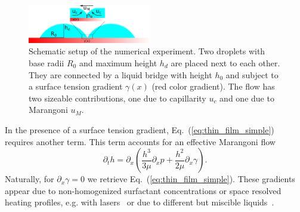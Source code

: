 \documentclass[twocolumn,amsmath,amssymb,showpacs,pre,nofootinbib,superscriptaddress]{revtex4-1} %
\begin{document}
\begin{figure}
    \centering
    \includegraphics[width=0.48\textwidth]{Figures/setup.png}
    \caption{Schematic setup of the numerical experiment. 
    Two droplets with base radii $R_0$ and maximum height $h_d$ are placed next to each other. 
    They are connected by a liquid bridge with height $h_0$ and subject to a surface tension gradient $\gamma(x)$ (red color gradient).
    The flow has two sizeable contributions, one due to capillarity $u_c$ and one due to Marangoni $u_M$.
    }
    \label{fig:schematics}
\end{figure}
In the presence of a surface tension gradient, Eq.~(\ref{eq:thin_film_simple}) requires another term.
This term accounts for an effective Marangoni flow~\cite{doi:10.1021/la500459v, karpitschka2014sharp, bestehorn20033d, doi:10.1021/la960488a}
\begin{equation}\label{eq:thin_with_marangoni}
    \partial_t h = \partial_x \left(\frac{h^3}{3\mu}\partial_x p + \frac{h^2}{2\mu}\partial_x\gamma\right).
\end{equation}
Naturally, for $\partial_x\gamma = 0$ we retrieve Eq.~(\ref{eq:thin_film_simple}).
These gradients appear due to non-homogenized surfactant concentrations or space resolved heating profiles, e.g. with lasers~\cite{doi:10.1021/la960488a, NIKOLOV2002325, bruning2018delayed, wedershoven2014infrared} or due to different but miscible liquids~\cite{doi:10.1021/la800630w, karpitschka2014sharp, doi:10.1021/la500459v}. 
\end{document}
